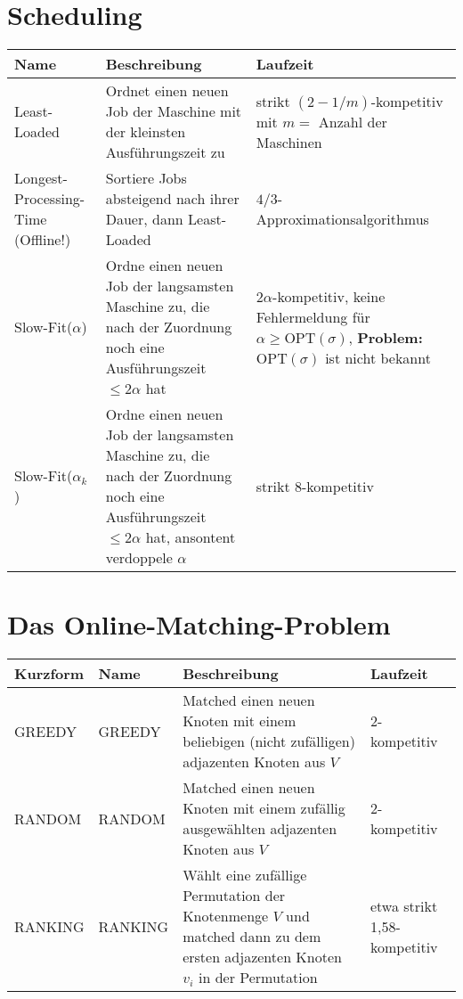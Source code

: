 \section{Scheduling}
\begin{tabularx}{\textwidth}{|l|X|X|} \hline
Name & Beschreibung & Laufzeit\\ \hline \hline
Least-Loaded & Ordnet einen neuen Job der Maschine mit der kleinsten Ausführungszeit zu & strikt $(2-1/m)$-kompetitiv mit $m =$ Anzahl der Maschinen\\ \hline
Longest-Processing-Time (Offline!) & Sortiere Jobs absteigend nach ihrer Dauer, dann Least-Loaded & $4/3$-Approximationsalgorithmus\\ \hline
Slow-Fit($\alpha$) & Ordne einen neuen Job der langsamsten Maschine zu, die nach der Zuordnung noch eine Ausführungszeit $\leq 2\alpha$ hat & $2\alpha$-kompetitiv, keine Fehlermeldung für $\alpha \geq \textrm{OPT}(\sigma)$, \textbf{Problem:} $\textrm{OPT}(\sigma)$ ist nicht bekannt \\ \hline
Slow-Fit($\alpha_k$) & Ordne einen neuen Job der langsamsten Maschine zu, die nach der Zuordnung noch eine Ausführungszeit $\leq 2\alpha$ hat, ansontent verdoppele $\alpha$ & strikt 8-kompetitiv \\ \hline
\end{tabularx}

\section{Das Online-Matching-Problem}
\begin{tabularx}{\textwidth}{|l|l|X|X|} \hline
Kurzform & Name & Beschreibung & Laufzeit\\ \hline \hline
GREEDY & GREEDY & Matched einen neuen Knoten mit einem beliebigen (nicht zufälligen) adjazenten Knoten aus $V$ & 2-kompetitiv \\ \hline
RANDOM & RANDOM & Matched einen neuen Knoten mit einem zufällig ausgewählten adjazenten Knoten aus $V$ & 2-kompetitiv \\ \hline
RANKING & RANKING & Wählt eine zufällige Permutation der Knotenmenge $V$ und matched dann zu dem ersten adjazenten Knoten $v_i$ in der Permutation & etwa strikt 1,58-kompetitiv \\ \hline
\end{tabularx}
